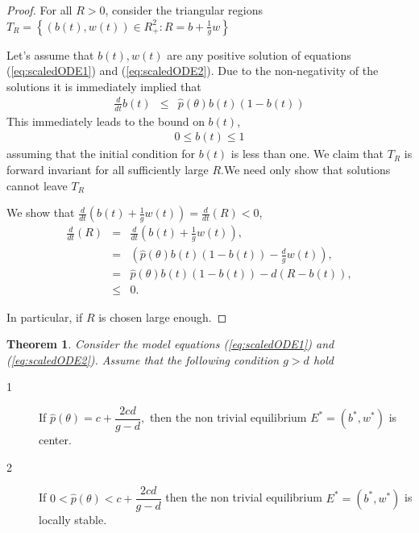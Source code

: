 \documentclass[12pt]{article}
\newtheorem{theorem}{Theorem}[section]
\begin{document}
\begin{proof}
For all $R>0$, consider the triangular regions $T_{R}=\left\{ \left(
b(t),w(t)\right) \in R_{+}^{2}:R=b+\frac{1}{g}w\right\} $

Let's assume that $b(t),w(t)$ are any positive solution of equations
(\ref{eq:scaledODE1}) and (\ref{eq:scaledODE2}). Due to the
non-negativity of the solutions it is immediately implied that
\begin{eqnarray}
  \frac{d}{dt}b(t) & \leq & \hat{p}\left( \theta \right) b(t)\left( 1-b(t)\right) 
\end{eqnarray}
This immediately leads to the bound on $b(t)$,
\begin{eqnarray}
  0\leq b(t)\leq 1
\end{eqnarray}
assuming that the initial condition for $b(t)$ is less than one.  We
claim that $T_{R}$ is forward invariant for all sufficiently large
$R.$We need only show that solutions cannot leave $T_{R}$

We show that
$\frac{d}{dt}\left( b(t)+\frac{1}{g}w(t)\right) =\frac{d}{dt}%
\left( R\right) <0$,
\begin{eqnarray}
  \frac{d}{dt}\left( R\right) & = & \frac{d}{dt}\left( b(t)+\frac{1}{g}w(t)\right), \\
                              & = & \left( \hat{p}\left( \theta \right) b(t)
                                    \left( 1-b(t)\right) -
                                     \frac{d}{g}w\left( t\right) \right), \\
                              & = & \hat{p}\left( \theta \right) b(t)\left(1-b(t)\right) -
                                    d\left( R-b(t)\right), \\
                              & \leq & 0.
\end{eqnarray}


In particular, if $R$ is chosen large enough.
\end{proof}
\begin{theorem}
   Consider the model equations (\ref{eq:scaledODE1}) and
  (\ref{eq:scaledODE2}). Assume that the following condition $g>d$
  hold
\end{theorem}

\begin{description}
\item[1]  If $%
\hat{p}(\theta )=c+\dfrac{2cd}{g-d},$ then the non trivial equilibrium $%
E^{\ast }=(b^{\ast },w^{\ast })$ is center.

\item[2] If $0<\hat{p}(\theta )<c+\dfrac{2cd}{g-d}$ then the non trivial
equilibrium $E^{\ast }=(b^{\ast },w^{\ast })$ is locally stable.
\end{description}
\end{document}

